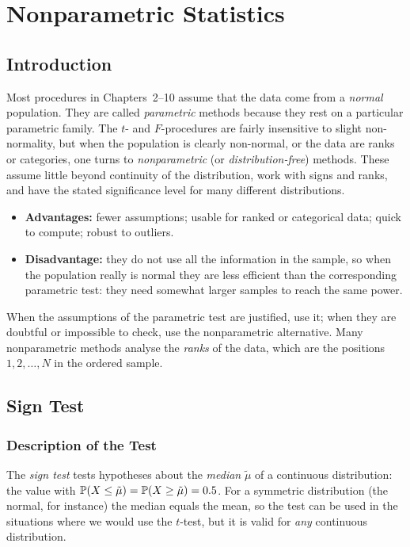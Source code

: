 \chapter{Nonparametric Statistics}

\section{Introduction}

Most procedures in Chapters~2--10 assume that the data come from a \emph{normal} population. They are called \emph{parametric} methods because they rest on a particular parametric family. The $t$- and $F$-procedures are fairly insensitive to slight non-normality, but when the population is clearly non-normal, or the data are ranks or categories, one turns to \emph{nonparametric} (or \emph{distribution-free}) methods. These assume little beyond continuity of the distribution, work with signs and ranks, and have the stated significance level for many different distributions.

\begin{itemize}
  \item \textbf{Advantages:} fewer assumptions; usable for ranked or categorical data; quick to compute; robust to outliers.
  \item \textbf{Disadvantage:} they do not use all the information in the sample, so when the population really is normal they are less efficient than the corresponding parametric test: they need somewhat larger samples to reach the same power.
\end{itemize}
When the assumptions of the parametric test are justified, use it; when they are doubtful or impossible to check, use the nonparametric alternative. Many nonparametric methods analyse the \emph{ranks} of the data, which are the positions $1,2,\dots,N$ in the ordered sample.

\section{Sign Test}

\subsection{Description of the Test}

The \emph{sign test} tests hypotheses about the \emph{median} $\tilde\mu$ of a continuous distribution: the value with $\mathbb{P}(X\le\tilde\mu)=\mathbb{P}(X\ge\tilde\mu)=0.5$. For a symmetric distribution (the normal, for instance) the median equals the mean, so the test can be used in the situations where we would use the $t$-test, but it is valid for \emph{any} continuous distribution.


